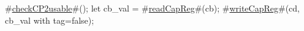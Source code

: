 #\hyperref[sailMIPSzcheckCP2usable]{checkCP2usable}#();
let cb_val = #\hyperref[sailMIPSzreadCapReg]{readCapReg}#(cb);
#\hyperref[sailMIPSzwriteCapReg]{writeCapReg}#(cd, {cb_val with tag=false});
